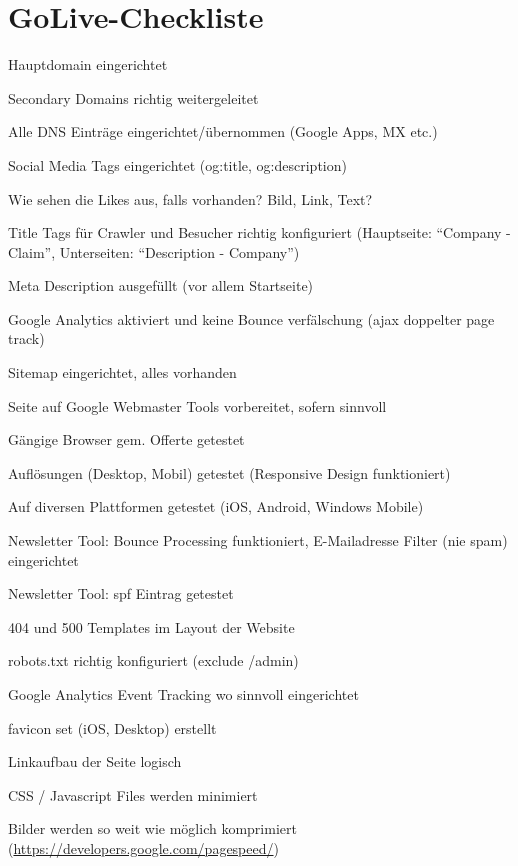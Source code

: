 
\section{GoLive-Checkliste}
\label{sec:appendix_golive_checkliste}
\begin{checklist}
  \item Hauptdomain eingerichtet
  \item Secondary Domains richtig weitergeleitet
  \item Alle DNS Einträge eingerichtet/übernommen (Google Apps, MX etc.)
  \item Social Media Tags eingerichtet (og:title, og:description)
  \item Wie sehen die Likes aus, falls vorhanden? Bild, Link, Text?
  \item Title Tags für Crawler und Besucher richtig konfiguriert (Hauptseite: ``Company - Claim'', Unterseiten: ``Description - Company'')
  \item Meta Description ausgefüllt (vor allem Startseite)
  \item Google Analytics aktiviert und keine Bounce verfälschung (ajax doppelter page track)
  \item Sitemap eingerichtet, alles vorhanden
  \item Seite auf Google Webmaster Tools vorbereitet, sofern sinnvoll
  \item Gängige Browser gem. Offerte getestet
  \item Auflösungen (Desktop, Mobil) getestet (Responsive Design funktioniert)
  \item Auf diversen Plattformen getestet (iOS, Android, Windows Mobile)
  \item Newsletter Tool: Bounce Processing funktioniert, E-Mailadresse Filter (nie spam) eingerichtet
  \item Newsletter Tool: spf Eintrag getestet
  \item 404 und 500 Templates im Layout der Website
  \item robots.txt richtig konfiguriert (exclude /admin)
  \item Google Analytics Event Tracking wo sinnvoll eingerichtet
  \item favicon set (iOS, Desktop) erstellt
  \item Linkaufbau der Seite logisch
  \item CSS / Javascript Files werden minimiert
  \item Bilder werden so weit wie möglich komprimiert (\url{https://developers.google.com/pagespeed/})

\end{checklist}
